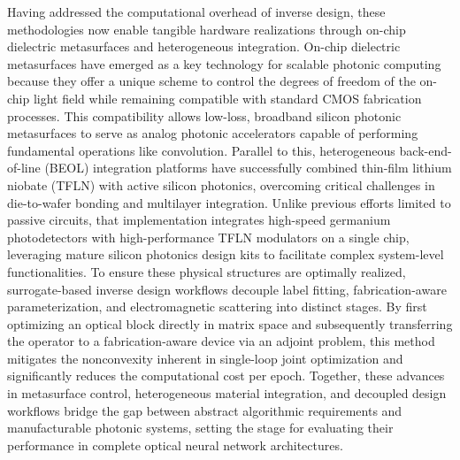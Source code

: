 \documentclass[11pt]{article}
\begin{document}
Having addressed the computational overhead of inverse design, these methodologies now enable tangible hardware realizations through on-chip dielectric metasurfaces and heterogeneous integration. On-chip dielectric metasurfaces have emerged as a key technology for scalable photonic computing because they offer a unique scheme to control the degrees of freedom of the on-chip light field while remaining compatible with standard CMOS fabrication processes. This compatibility allows low-loss, broadband silicon photonic metasurfaces to serve as analog photonic accelerators capable of performing fundamental operations like convolution. Parallel to this, heterogeneous back-end-of-line (BEOL) integration platforms have successfully combined thin-film lithium niobate (TFLN) with active silicon photonics, overcoming critical challenges in die-to-wafer bonding and multilayer integration. Unlike previous efforts limited to passive circuits, that implementation integrates high-speed germanium photodetectors with high-performance TFLN modulators on a single chip, leveraging mature silicon photonics design kits to facilitate complex system-level functionalities. To ensure these physical structures are optimally realized, surrogate-based inverse design workflows decouple label fitting, fabrication-aware parameterization, and electromagnetic scattering into distinct stages. By first optimizing an optical block directly in matrix space and subsequently transferring the operator to a fabrication-aware device via an adjoint problem, this method mitigates the nonconvexity inherent in single-loop joint optimization and significantly reduces the computational cost per epoch. Together, these advances in metasurface control, heterogeneous material integration, and decoupled design workflows bridge the gap between abstract algorithmic requirements and manufacturable photonic systems, setting the stage for evaluating their performance in complete optical neural network architectures. \citep{doi_10_1515_nanoph_2022_0294_1bd118d5} \citep{s2_9b444e84d20ae6e3d62d2d4df30268b5a53baad2_40af2cc9} \citep{s2_753a5d83a96e0194da93bcb6f20fa0bd356e37fa_c11e3796}
\end{document}
